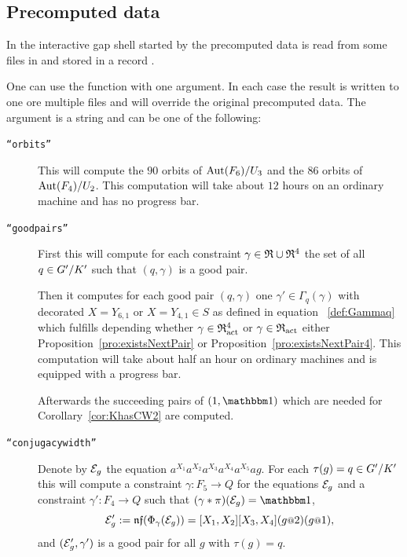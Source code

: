 \documentclass[a4paper,11pt]{amsart}
\begin{document}
\subsection{Precomputed data}\label{sec:precomputation}
In the interactive gap shell started by 
the precomputed data is read from some files in  and stored in 
a record . 

One can use the function  with one argument. In each case
the result is written to one ore multiple files and will override the original precomputed data. 
The argument is a string and can be one of the following:
\begin{description}
    \item [\texttt{``orbits''}] This will compute the $90$ orbits 
    of ${\operatorname{{Aut}}(F_6)/U_3}$ and the
		$86$ orbits of ${\operatorname{{Aut}}(F_4)/U_2}$. This computation will take
		about $12$ hours on an ordinary machine and has no progress bar.
   \item [\texttt{``goodpairs''}] First this will compute for each constraint $\gamma\in\mathfrak{R}\cup\mathfrak{R}^4$ 
		      the set of all $q\in{G'/K'}$ such that $(q,\gamma)$ is a good pair.
		      
		      Then it computes for each good pair $(q,\gamma)$ one $\gamma'\in\Gamma_q(\gamma)$
		      with decorated $X=Y_{6,1}$ or $X=Y_{4,1}\in S$ as defined in equation~
          \eqref{def:Gammaq} which
		      fulfills depending whether $\gamma\in\mathfrak{R}^4_{\operatorname{act}}$ or $\gamma\in\mathfrak{R}_{\operatorname{act}}$ 
		      either Proposition~\ref{pro:existsNextPair} or Proposition~\ref{pro:existsNextPair4}.
		      This computation will take about half an hour on ordinary machines
           and is equipped with a progress bar. 
		      
		      Afterwards the succeeding pairs of $(1,\id)$ which are 
          needed for Corollary~\ref{cor:KhasCW2} are computed. 
   \item [\texttt{``conjugacywidth''}] Denote by $\mathcal{E}_g$ the equation $a^{X_1}a^{X_2}a^{X_3}a^{X_4}a^{X_5}ag$.
		      For each $\tau(g)=q\in{G'/K'}$ this will compute a constraint 
		      $\gamma\colon F_5 \to Q$ for the equations $\mathcal{E}_g$
		      and a constraint $\gamma'\colon F_4\to Q$ such that
		      $(\gamma * \pi)(\eq{E}_g) = \id$,
		      \[\eq{E}'_g := \nf(\Phi_\gamma(\eq{E}_g))=[X_1,X_2][X_3,X_4](g\at{2})(g\at{1}),\] and
		      $(\mathcal{E}'_g,\gamma')$ is a good pair for all $g$ with $\tau(g)=q$.
		      

\end{description}
\end{document}
